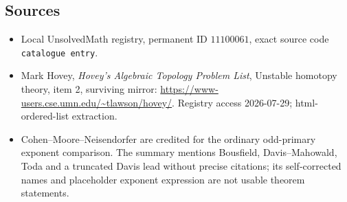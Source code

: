 \documentclass[11pt]{article}
\begin{document}
\subsection{Sources}
\begin{itemize}
\item Local UnsolvedMath registry, permanent ID \(11100061\), exact source code \texttt{catalogue entry}.
\item Mark Hovey, \emph{Hovey's Algebraic Topology Problem List}, Unstable homotopy theory, item 2, surviving mirror: \url{https://www-users.cse.umn.edu/~tlawson/hovey/}. Registry access 2026-07-29; html-ordered-list extraction.
\item Cohen--Moore--Neisendorfer are credited for the ordinary odd-primary exponent comparison. The summary mentions Bousfield, Davis--Mahowald, Toda and a truncated Davis lead without precise citations; its self-corrected names and placeholder exponent expression are not usable theorem statements.
\end{itemize}
\end{document}
